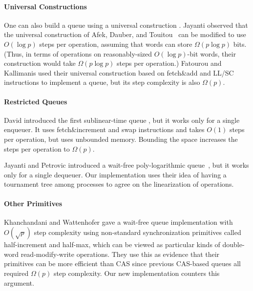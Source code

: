 \paragraph{Universal Constructions}
One can also build a queue using a universal construction \cite{10.1145/114005.102808}.
Jayanti \cite{DBLP:conf/podc/Jayanti98a} observed that
the universal construction of Afek, Dauber, and
Touitou~\cite{DBLP:conf/stoc/AfekDT95} can be modified to use $O(\log p)$ steps per operation, 
assuming that words can store $\Omega(p \log p)$ bits. 
(Thus, in terms of operations on reasonably-sized $O(\log p)$-bit words, their construction would take $\Omega(p\log p)$ steps per operation.)
Fatourou and Kallimanis \cite{FK14} used their universal construction based on fetch\&add and LL/SC instructions
to implement a queue, but its step complexity is also $\Omega(p)$.

\paragraph{Restricted Queues}
David introduced the first sublinear-time queue
\cite{DBLP:conf/wdag/David04}, but it works only for a single enqueuer.
It uses fetch\&increment and swap  instructions and takes $O(1)$ steps per operation, but
uses unbounded memory.  Bounding the space increases the steps per operation to $\Omega(p)$.

Jayanti and Petrovic introduced a wait-free poly-logarithmic
queue~\cite{DBLP:conf/fsttcs/JayantiP05}, but it works only for a single dequeuer. 
Our implementation uses their idea of having
a tournament tree among processes to agree on the linearization of
operations.


\paragraph{Other Primitives}
Khanchandani and Wattenhofer \cite{KW18} gave a wait-free queue implementation
with $O(\sqrt{p})$ step complexity using non-standard synchronization primitives
called half-increment and half-max, which can be viewed as particular kinds of
double-word read-modify-write operations.
They use this as evidence that their primitives can be more efficient than CAS
since previous CAS-based queues all required $\Omega(p)$ step complexity.
Our new implementation counters this argument.

